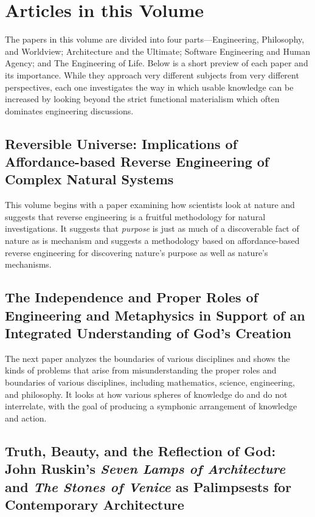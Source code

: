 \section{Articles in this Volume}

The papers in this volume are divided into four parts---Engineering, Philosophy, and Worldview; Architecture and the Ultimate; Software Engineering and Human Agency; and The Engineering of Life.  Below is a short preview of each paper and its importance.  While they
approach very different subjects from very different perspectives, each one investigates the way in which usable knowledge can be increased by looking beyond the strict functional materialism which often dominates engineering discussions.

\subsection*{Reversible Universe: Implications of Affordance-based Reverse Engineering of Complex Natural Systems}

This volume begins with a paper examining how scientists look at nature and suggests that reverse engineering is a fruitful methodology for natural investigations.  It suggests that \emph{purpose} is just as much of a discoverable fact of nature as is mechanism and suggests a methodology based on affordance-based reverse engineering for discovering nature's purpose as well as nature's mechanisms.  

\subsection*{The Independence and Proper Roles of Engineering and Metaphysics in Support of an Integrated Understanding of God's Creation}

The next paper analyzes the boundaries of various disciplines and shows the kinds of problems that arise from misunderstanding the proper roles and boundaries of various disciplines, including mathematics, science, engineering, and philosophy.  It looks at how various spheres of knowledge do and do not interrelate, with the goal of producing a symphonic arrangement of knowledge and action.

\subsection*{Truth, Beauty, and the Reflection of God: John Ruskin's \textit{Seven Lamps of Architecture} and \textit{The Stones of Venice} as Palimpsests for Contemporary Architecture}

